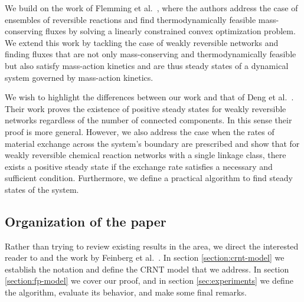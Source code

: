 \documentclass[smallextended]{svjour3}       %
\newcounter{sent}
\newcommand*{\0}{\mathbf{0}}
\newcommand*{\1}{\mathbf{1}}
\newcommand*{\R}{\mathbbm{R}}
\begin{document}
We build on the work of Flemming et al.\ \cite{fleming-opt}, where the authors
address the case of ensembles of reversible reactions and find
thermodynamically feasible mass-conserving fluxes by solving a linearly 
constrained convex optimization problem. We extend this work by tackling the case
of weakly reversible networks and finding fluxes that are not only mass-conserving
and thermodynamically feasible but also satisfy mass-action kinetics and 
are thus steady states of a dynamical system governed by mass-action kinetics.

We wish to highlight the differences between our work and that of Deng et al.\ 
\cite{Deng}. Their work proves the existence of positive steady states for 
weakly reversible networks regardless of the number of connected components.
In this sense their proof is more general. However, we
also address the case when the rates of material exchange across the system's 
boundary are prescribed and show that for weakly reversible chemical reaction
networks with a single linkage class, there exists a positive steady state if
the exchange rate satisfies a necessary and sufficient condition. Furthermore, we 
define a practical algorithm to find steady states of the system.

\subsection{Organization of the paper}

Rather than trying to review existing results in the area, we direct the 
interested reader to \cite{gunawardena,GMAK} and the work by Feinberg et al.\ 
\cite{deficiency0,deficiency1}. In section \ref{section:crnt-model} we establish
the notation and define the CRNT model that we address. In section
\ref{section:fp-model} we cover our proof, and in section \ref{sec:experiments}
we define the algorithm, evaluate its behavior, and make some final remarks.

%
%
\end{document}
